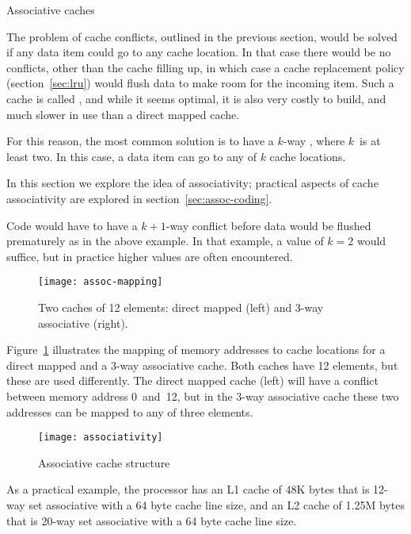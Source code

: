  {Associative caches}
\label{sec:associative}

The problem of cache conflicts, outlined in the previous section, would
be solved if any data item could go to any cache location. In that
case there would be no conflicts, other than the cache filling up, in
which case a cache replacement policy (section~\ref{sec:lru}) would
flush data to make room for the incoming item. Such a cache is called
, and while it seems optimal, it is also
very costly to build, and much slower in use than a direct mapped cache.

For this reason, the most common solution is to have a
$k$-way , where $k$~is at least two. In
this case, a data item can go to any of $k$ cache locations.

In this section we explore the idea of associativity;
practical aspects of cache associativity are explored
in section~\ref{sec:assoc-coding}.

Code
would have to have a $k+1$-way conflict before data would be flushed
prematurely as in the above example. In that example, a value of $k=2$
would suffice, but in practice higher values are often encountered.
\begin{figure}[ht]
\texttt{[image: assoc-mapping]}
\caption{Two caches of 12 elements: direct mapped (left) and 3-way associative (right).}
\label{fig:assoc-mapping}
\end{figure}
Figure~\ref{fig:assoc-mapping} illustrates the mapping of memory
addresses to cache locations for a direct mapped and a 3-way associative
cache. Both caches have 12 elements, but these are used differently.
The direct mapped cache (left)
will have a conflict between memory address 0~and~12, but
in the 3-way associative cache these two addresses can be mapped
to any of three elements.

\begin{figure}[ht]
  \texttt{[image: associativity]}
  \caption{Associative cache structure}
  \label{fig:icelake-associative}
\end{figure}

As a practical example, the
 processor has
an L1 cache of 48K bytes that is 12-way set associative with a 64
  byte cache line size, and
an L2 cache of 1.25M bytes that is 20-way set associative with a 64
byte cache line size.
\begin{comment}
  On the other hand, the \indextermbus{AMD}{Barcelona} chip
  has 2-way associativity for the L1 cache, and 8-way for
  the~L2. A~higher associativity (`way-ness') is obviously desirable,
  but makes a processor slower, since determining whether an address is
  already in cache becomes more complicated. For this reason, the
  associativity of the L1~cache, where speed is of the greatest
  importance, is typically lower than of the L2.
\end{comment}

